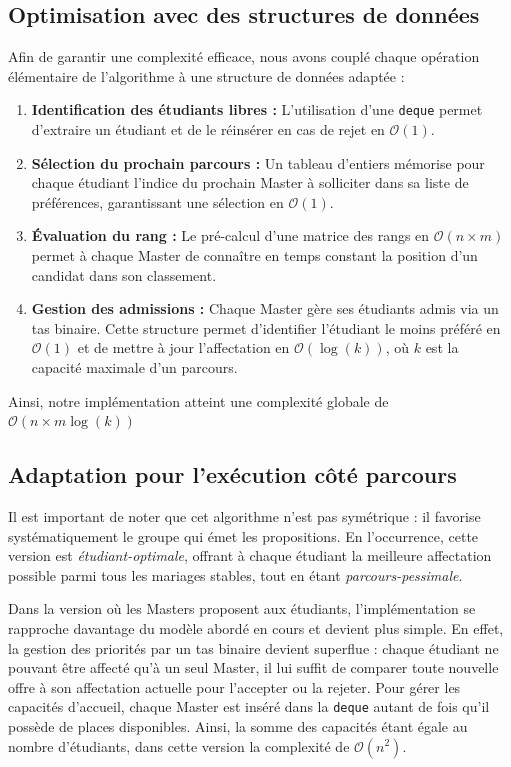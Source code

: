 \documentclass{article}
\begin{document}
\subsection{Optimisation avec des structures de données}
Afin de garantir une complexité efficace, nous avons couplé chaque opération élémentaire de 
l'algorithme à une structure de données adaptée :

\begin{enumerate}
      \item \textbf{Identification des étudiants libres :} L'utilisation d'une \texttt{deque} permet d'extraire 
      un étudiant et de le réinsérer en cas de rejet en $\mathcal{O}(1)$.  
      
      \item \textbf{Sélection du prochain parcours :} Un tableau d'entiers mémorise pour chaque étudiant l'indice 
      du prochain Master à solliciter dans sa liste de préférences, garantissant une sélection en $\mathcal{O}(1)$.
  
      \item \textbf{Évaluation du rang :} Le pré-calcul d'une matrice des rangs en $\mathcal{O}(n \times m)$ 
      permet à chaque Master de connaître en temps constant la position d'un candidat dans son classement. 
      
  
      \item \textbf{Gestion des admissions :} Chaque Master gère ses étudiants admis via un tas binaire. 
      Cette structure permet d'identifier l'étudiant le moins préféré en $\mathcal{O}(1)$ et de 
      mettre à jour l'affectation en $\mathcal{O}(\log(k))$, où $k$ est la capacité maximale 
      d'un parcours.
\end{enumerate}

Ainsi, notre implémentation atteint une complexité globale de $\mathcal{O}(n \times m \log(k))$

\subsection{Adaptation pour l'exécution côté parcours}

Il est important de noter que cet algorithme n'est pas symétrique : il favorise systématiquement 
le groupe qui émet les propositions. En l'occurrence, cette version est \textit{étudiant-optimale}, 
offrant à chaque étudiant la meilleure affectation possible parmi tous les mariages stables, tout 
en étant \textit{parcours-pessimale}.

Dans la version où les Masters proposent aux étudiants, l'implémentation se rapproche davantage du 
modèle abordé en cours et devient plus simple. En effet, la gestion des priorités par un tas binaire 
devient superflue : chaque étudiant ne pouvant être affecté qu'à un seul Master, il lui suffit de 
comparer toute nouvelle offre à son affectation actuelle pour l'accepter ou la rejeter. Pour gérer 
les capacités d'accueil, chaque Master est inséré dans la \texttt{deque} autant de fois qu'il possède 
de places disponibles. Ainsi, la somme des capacités étant égale au nombre d'étudiants, dans cette 
version la complexité de $\mathcal{O}(n^2)$. 
\end{document}
